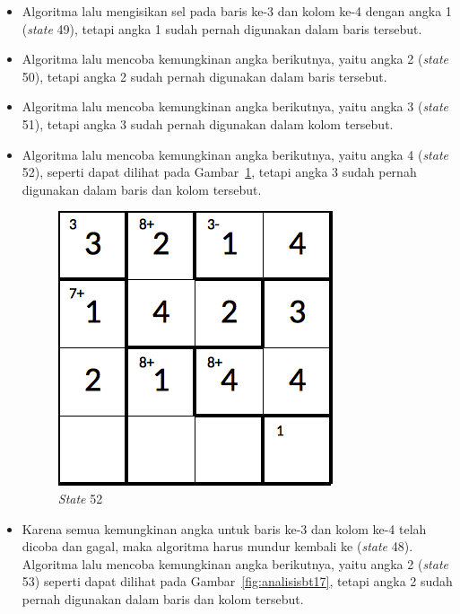 \documentclass[a4paper,twoside]{article}
\begin{document}
\begin{enumerate}
\begin{itemize}
\item Algoritma lalu mengisikan sel pada baris ke-3 dan kolom ke-4 dengan angka 1 (\textit{state} 49), tetapi angka 1 sudah pernah digunakan dalam baris tersebut.
\item Algoritma lalu mencoba kemungkinan angka berikutnya, yaitu angka 2 (\textit{state} 50), tetapi angka 2 sudah pernah digunakan dalam baris tersebut.
\item Algoritma lalu mencoba kemungkinan angka berikutnya, yaitu angka 3 (\textit{state} 51), tetapi angka 3 sudah pernah digunakan dalam kolom tersebut.
\item Algoritma lalu mencoba kemungkinan angka berikutnya, yaitu angka 4 (\textit{state} 52), seperti dapat dilihat pada Gambar~\ref{fig:analisisbt16}, tetapi angka 3 sudah pernah digunakan dalam baris dan kolom tersebut.

\begin{figure}
\centering
\captionsetup{justification=centering}
\includegraphics[scale=0.333]{Gambar/backtracking/State52}
\caption[\textit{State} 52]{\textit{State} 52}
\label{fig:analisisbt16}
\end{figure}

\item Karena semua kemungkinan angka untuk baris ke-3 dan kolom ke-4 telah dicoba dan gagal, maka algoritma harus mundur kembali ke (\textit{state} 48). Algoritma lalu mencoba kemungkinan angka berikutnya, yaitu angka 2 (\textit{state} 53) seperti dapat dilihat pada Gambar~\ref{fig:analisisbt17}, tetapi angka 2 sudah pernah digunakan dalam baris dan kolom tersebut.


\end{itemize}
\end{enumerate}
\end{document}
